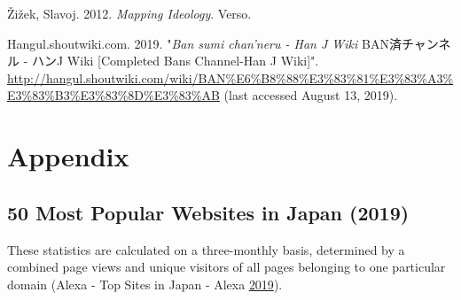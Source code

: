 \documentclass[10pt,british,A4paper,oneside]{memoir}
\begin{document}
\hypertarget{ref-zizek_mapping_2012}{}
Žižek, Slavoj. 2012. \emph{Mapping Ideology}. Verso.

\hypertarget{ref-j_wiki_completed_2019}{}
Hangul.shoutwiki.com. 2019. "\emph{Ban sumi chan'neru - Han J Wiki} BAN済チャンネル - ハンJ Wiki [Completed Bans Channel-Han J Wiki]".
\url{http://hangul.shoutwiki.com/wiki/BAN\%E6\%B8\%88\%E3\%83\%81\%E3\%83\%A3\%E3\%83\%B3\%E3\%83\%8D\%E3\%83\%AB} (last accessed August 13, 2019).

\endgroup

\newpage

\appendix
{} 

\chapter{Appendix}\label{appendix}

\section{50 Most Popular Websites in Japan
(2019)}\label{most-popular-websites-in-japan-2019}

These statistics are calculated on a three-monthly basis, determined by
a combined page views and unique visitors of all pages belonging to one
particular domain (Alexa - Top Sites in Japan - Alexa
\protect\hyperlink{ref-noauthor_alexa_2019}{2019}).

\begin{table}[!htb]
\footnotesize
\centering
\setlength{\tabcolsep}{5pt}
\caption{50 Most Popular Websites in Japan (2019)}\label{tab:50mostpopjp}
\end{table}
\end{document}
